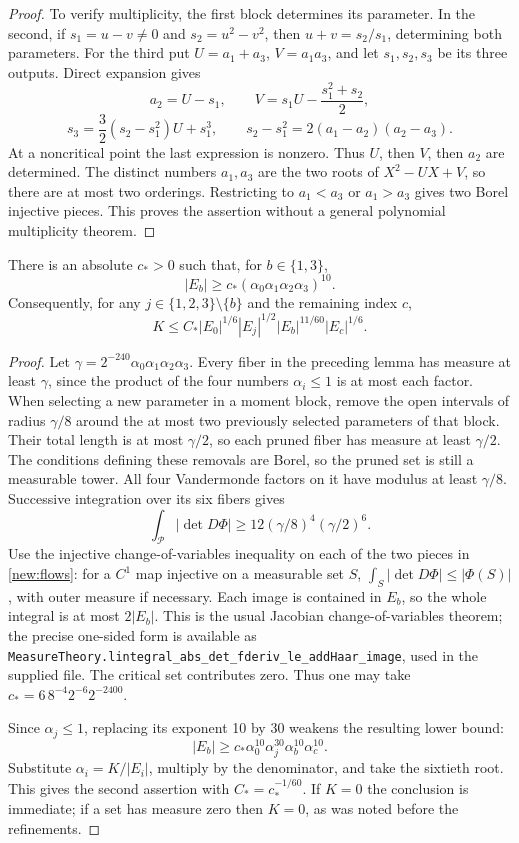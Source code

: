 \documentclass[11pt]{article}
\theoremstyle{definition}
\newcommand{\pid}[1]{\nolinkurl{#1}}
\begin{document}
\begin{proof}
To verify multiplicity, the first block determines its parameter. In the second, if
$s_1=u-v\ne0$ and $s_2=u^2-v^2$, then $u+v=s_2/s_1$, determining both parameters.
For the third put $U=a_1+a_3$, $V=a_1a_3$, and let $s_1,s_2,s_3$ be its three outputs.
Direct expansion gives
\[
 a_2=U-s_1,\qquad V=s_1U-\frac{s_1^2+s_2}{2},
\]
\[
 s_3=\frac32(s_2-s_1^2)U+s_1^3,
 \qquad s_2-s_1^2=2(a_1-a_2)(a_2-a_3).
\]
At a noncritical point the last expression is nonzero. Thus $U$, then $V$, then $a_2$
are determined. The distinct numbers $a_1,a_3$ are the two roots of $X^2-UX+V$, so there
are at most two orderings. Restricting to $a_1<a_3$ or $a_1>a_3$ gives two Borel injective
pieces. This proves the assertion without a general polynomial multiplicity theorem.
\end{proof}

\begin{lemma}\label{new:incidence-consequence}
There is an absolute $c_*>0$ such that, for $b\in\{1,3\}$,
\[
 |E_b|\geq c_*(\alpha_0\alpha_1\alpha_2\alpha_3)^{10}.
\]
Consequently, for any $j\in\{1,2,3\}\setminus\{b\}$ and the remaining index $c$,
\[
 K\leq C_*|E_0|^{1/6}|E_j|^{1/2}|E_b|^{11/60}|E_c|^{1/6}.
\]
\end{lemma}
\begin{proof}
Let $\gamma=2^{-240}\alpha_0\alpha_1\alpha_2\alpha_3$. Every fiber in the preceding
lemma has measure at least $\gamma$, since the product of the four numbers $\alpha_i\leq1$
is at most each factor. When selecting a new parameter in a moment block, remove the open
intervals of radius $\gamma/8$ around the at most two previously selected parameters of
that block. Their total length is at most $\gamma/2$, so each pruned fiber has measure at
least $\gamma/2$. The conditions defining these removals are Borel, so the pruned set is
still a measurable tower. All four Vandermonde factors on it have modulus at least $\gamma/8$.
Successive integration over its six fibers gives
\[
 \int_{\mathcal P}|\det D\Phi|\geq
 12(\gamma/8)^4(\gamma/2)^6.
\]
Use the injective change-of-variables inequality on each of the two pieces in
\cref{new:flows}: for a $C^1$ map injective on a measurable set $S$,
$\int_S|\det D\Phi|\leq|\Phi(S)|$, with outer measure if necessary.
Each image is contained in $E_b$, so the whole integral is at most $2|E_b|$.
This is the usual Jacobian change-of-variables theorem; the precise one-sided form is
available as \pid{MeasureTheory.lintegral_abs_det_fderiv_le_addHaar_image}, used in the
supplied file. The critical set contributes zero. Thus one may take
$c_*=6\,8^{-4}2^{-6}2^{-2400}$.

Since $\alpha_j\leq1$, replacing its exponent 10 by 30 weakens the resulting lower bound:
\[
 |E_b|\geq c_*\alpha_0^{10}\alpha_j^{30}\alpha_b^{10}\alpha_c^{10}.
\]
Substitute $\alpha_i=K/|E_i|$, multiply by the denominator, and take the sixtieth root.
This gives the second assertion with $C_*=c_*^{-1/60}$. If $K=0$ the conclusion is immediate;
if a set has measure zero then $K=0$, as was noted before the refinements.
\end{proof}
\end{document}
